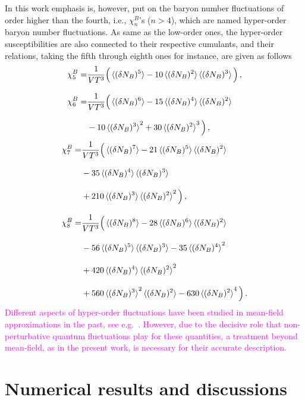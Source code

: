\documentclass[%
reprint,
superscriptaddress,
showpacs,preprintnumbers,
 amsmath,amssymb,
 aps,
prd,
]{revtex4-1}
\newcommand{\colfab}[1]{\textcolor{magenta}{#1}}
\begin{document}
In this work emphasis is, however, put on the baryon number fluctuations of order higher than the fourth, i.e., $\chi_n^{B}$'s ($n>4$), which are named hyper-order baryon number fluctuations. As same as the low-order ones, the hyper-order susceptibilities are also connected to their respective cumulants, and their relations, taking the fifth through eighth ones for instance, are given as follows
%
\begin{align}
\chi^B_5=&\frac{1}{VT^3}\Big(\braket{(\delta N_B)^5}-10\braket{(\delta N_B)^2}\braket{(\delta N_B)^3}\Big)\,,\\[2ex]
\chi^B_6=&\frac{1}{VT^3}\Big(\braket{(\delta N_B)^6}-15\braket{(\delta N_B)^4}\braket{(\delta N_B)^2}\nonumber\\[2ex]
&-10\braket{(\delta N_B)^3}^2+30\braket{(\delta N_B)^2}^3\Big)\,,
\end{align}
\begin{align}
\chi^B_7=&\frac{1}{VT^3}\Big(\braket{(\delta N_B)^7}-21\braket{(\delta N_B)^5}\braket{(\delta N_B)^2}\nonumber\\[2ex]
&-35\braket{(\delta N_B)^4}\braket{(\delta N_B)^3}\nonumber\\[2ex]
&+210\braket{(\delta N_B)^3}\braket{(\delta N_B)^2}^2\Big)\,,\\[2ex]
\chi^B_8=&\frac{1}{VT^3}\Big(\braket{(\delta N_B)^8}-28\braket{(\delta N_B)^6}\braket{(\delta N_B)^2}\nonumber\\[2ex]
&-56\braket{(\delta N_B)^5}\braket{(\delta N_B)^3}-35\braket{(\delta N_B)^4}^2\nonumber\\[2ex]
&+420\braket{(\delta N_B)^4}\braket{(\delta N_B)^2}^2\nonumber\\[2ex]
&+560\braket{(\delta N_B)^3}^2\braket{(\delta N_B)^2}-630\braket{(\delta N_B)^2}^4\Big)\,.
\end{align}
%
\colfab{Different aspects of hyper-order fluctuations have been studied in mean-field approximations in the past, see e.g.\ \cite{Wagner:2009pm, Karsch:2010hm, Schaefer:2011ex}. However, due to the decisive role that non-perturbative quantum fluctuations play for these quantities, a treatment beyond mean-field, as in the present work, is necessary for their accurate description.}



\section{Numerical results and discussions}
\label{sec:num}
\end{document}
